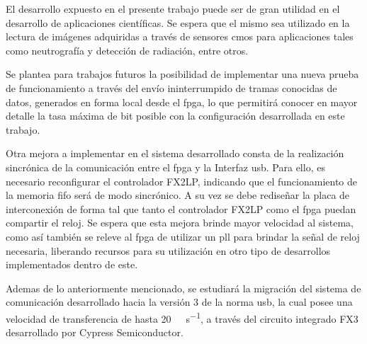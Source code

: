 El desarrollo expuesto en el presente trabajo puede ser de gran utilidad en el desarrollo de aplicaciones científicas. Se espera que el mismo sea utilizado en la lectura de imágenes adquiridas a través de sensores \acrshort{cmos} para aplicaciones tales como neutrografía y detección de radiación, entre otros.

Se plantea para trabajos futuros la posibilidad de implementar una nueva prueba de funcionamiento a través del envío ininterrumpido de tramas conocidas de datos, generados en forma local desde el \acrshort{fpga}, lo que permitirá conocer en mayor detalle la tasa máxima de bit posible con la configuración desarrollada en este trabajo.

Otra mejora a implementar en el sistema desarrollado consta de la realización sincrónica de la comunicación entre el \acrshort{fpga} y la Interfaz \acrshort{usb}. Para ello, es necesario reconfigurar el controlador FX2LP, indicando que el funcionamiento de la memoria \acrshort{fifo} será de modo sincrónico. A su vez se debe rediseñar la placa de interconexión de forma tal que tanto el controlador FX2LP como el \acrshort{fpga} puedan compartir el reloj. Se espera que esta mejora brinde mayor velocidad al sistema, como así también se releve al \acrshort{fpga} de utilizar un \acrshort{pll} para brindar la señal de reloj necesaria, liberando recursos para su utilización en otro tipo de desarrollos implementados dentro de este.

Ademas de lo anteriormente mencionado, se estudiará la migración del sistema de comunicación desarrollado hacia la versión 3 de la norma \acrshort{usb}, la cual posee una velocidad de transferencia de hasta \SI{20}{\giga\bit\per\second}, a través del circuito integrado FX3 desarrollado por Cypress Semiconductor.